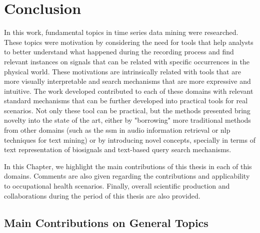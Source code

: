 
%

\chapter{Conclusion}
\label{cha:Conclusion}


In this work, fundamental topics in time series data mining were researched. These topics were motivation by considering the need for tools that help analysts to better understand what happened during the recording process and find relevant instances on signals that can be related with specific occurrences in the physical world. These motivations are intrinsically related with tools that are more visually interpretable and search mechanisms that are more expressive and intuitive. The work developed contributed to each of these domains with relevant standard mechanisms that can be further developed into practical tools for real scenarios. Not only these tool can be practical, but the methods presented bring novelty into the state of the art, either by "borrowing" more traditional methods from other domains (such as the \gls{ssm} in audio information retrieval or \gls{nlp} techniques for text mining) or by introducing novel concepts, specially in terms of text representation of biosignals and text-based query search mechanisms.
\par
In this Chapter, we highlight the main contributions of this thesis in each of this domains. Comments are also given regarding the contributions and applicability to occupational health scenarios. Finally, overall scientific production and collaborations during the period of this thesis are also provided. 

\section{Main Contributions on General Topics}

